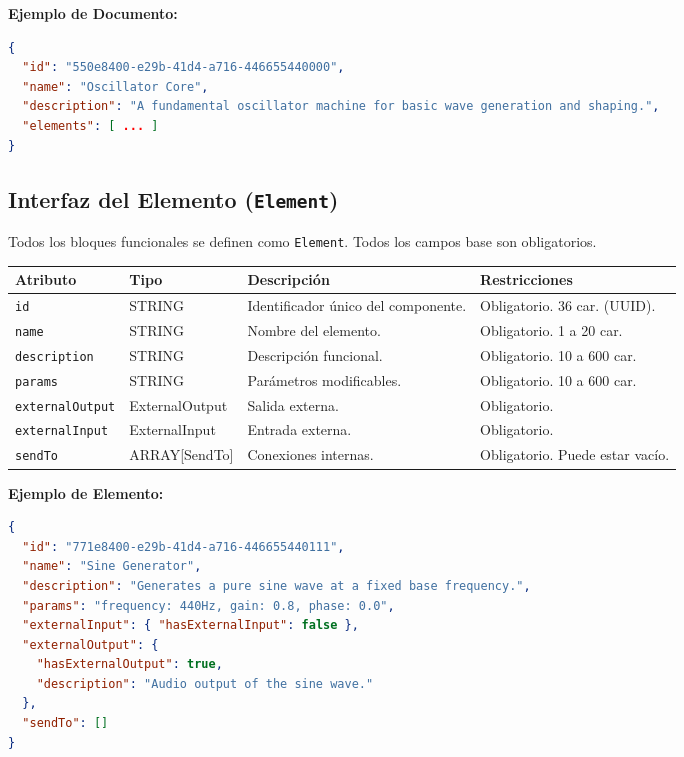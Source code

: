\textbf{Ejemplo de Documento:}
\begin{lstlisting}[language=json]
{
  "id": "550e8400-e29b-41d4-a716-446655440000",
  "name": "Oscillator Core",
  "description": "A fundamental oscillator machine for basic wave generation and shaping.",
  "elements": [ ... ]
}
\end{lstlisting}

\subsection{Interfaz del Elemento (\texttt{Element})}

Todos los bloques funcionales se definen como \texttt{Element}. Todos los campos base son obligatorios.

\begin{table}[H]
\centering
\small
\begin{tabular}{@{}llp{3cm}l@{}}
\toprule
Atributo & Tipo & Descripción & Restricciones \\ \midrule
\texttt{id} & STRING & Identificador único del componente. & Obligatorio. 36 car. (UUID). \\
\texttt{name} & STRING & Nombre del elemento. & Obligatorio. 1 a 20 car. \\
\texttt{description} & STRING & Descripción funcional. & Obligatorio. 10 a 600 car. \\
\texttt{params} & STRING & Parámetros modificables. & Obligatorio. 10 a 600 car. \\
\texttt{externalOutput} & ExternalOutput & Salida externa. & Obligatorio. \\
\texttt{externalInput} & ExternalInput & Entrada externa. & Obligatorio. \\
\texttt{sendTo} & ARRAY[SendTo] & Conexiones internas. & Obligatorio. Puede estar vacío. \\ \bottomrule
\end{tabular}
\end{table}

\textbf{Ejemplo de Elemento:}
\begin{lstlisting}[language=json]
{
  "id": "771e8400-e29b-41d4-a716-446655440111",
  "name": "Sine Generator",
  "description": "Generates a pure sine wave at a fixed base frequency.",
  "params": "frequency: 440Hz, gain: 0.8, phase: 0.0",
  "externalInput": { "hasExternalInput": false },
  "externalOutput": {
    "hasExternalOutput": true,
    "description": "Audio output of the sine wave."
  },
  "sendTo": []
}
\end{lstlisting}

